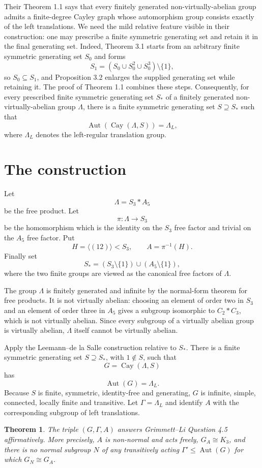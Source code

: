 \documentclass[11pt]{article}
\newtheorem{theorem}{Theorem}
\newcommand{\Aut}{\operatorname{Aut}}
\newcommand{\Cay}{\operatorname{Cay}}
\begin{document}
Their Theorem 1.1 says that every finitely generated non-virtually-abelian group admits a finite-degree Cayley graph whose automorphism group consists exactly of the left translations.  We need the mild relative feature visible in their construction: one may prescribe a finite symmetric generating set and retain it in the final generating set.  Indeed, Theorem 3.1 starts from an arbitrary finite symmetric generating set $S_0$ and forms
\[
S_1=(S_0\cup S_0^2\cup S_0^3)\setminus\{1\},
\]
so $S_0\subseteq S_1$, and Proposition 3.2 enlarges the supplied generating set while retaining it.  The proof of Theorem 1.1 combines these steps.  Consequently, for every prescribed finite symmetric generating set $S_*$ of a finitely generated non-virtually-abelian group $\Lambda$, there is a finite symmetric generating set $S\supseteq S_*$ such that
\[
\Aut(\Cay(\Lambda,S))=\Lambda_L,
\]
where $\Lambda_L$ denotes the left-regular translation group.

\section{The construction}

Let
\[
\Lambda=S_3*A_5
\]
be the free product.  Let
\[
\pi:\Lambda\longrightarrow S_3
\]
be the homomorphism which is the identity on the $S_3$ free factor and trivial on the $A_5$ free factor.  Put
\[
H=\langle(12)\rangle<S_3,
\qquad
A=\pi^{-1}(H).
\]
Finally set
\[
S_*=(S_3\setminus\{1\})\cup(A_5\setminus\{1\}),
\]
where the two finite groups are viewed as the canonical free factors of $\Lambda$.

The group $\Lambda$ is finitely generated and infinite by the normal-form theorem for free products.  It is not virtually abelian: choosing an element of order two in $S_3$ and an element of order three in $A_5$ gives a subgroup isomorphic to $C_2*C_3$, which is not virtually abelian.  Since every subgroup of a virtually abelian group is virtually abelian, $\Lambda$ itself cannot be virtually abelian.

Apply the Leemann--de la Salle construction relative to $S_*$.  There is a finite symmetric generating set $S\supseteq S_*$, with $1\notin S$, such that
\[
G=\Cay(\Lambda,S)
\]
has
\[
\Aut(G)=\Lambda_L.
\]
Because $S$ is finite, symmetric, identity-free and generating, $G$ is infinite, simple, connected, locally finite and transitive.  Let $\Gamma=\Lambda_L$ and identify $A$ with the corresponding subgroup of left translations.

\begin{theorem}\label{thm:main}
The triple $(G,\Gamma,A)$ answers Grimmett--Li Question 4.5 affirmatively.  More precisely, $A$ is non-normal and acts freely, $G_A\cong K_3$, and there is no normal subgroup $N$ of any transitively acting $\Gamma'\leq\Aut(G)$ for which $G_N\cong G_A$.
\end{theorem}
\end{document}
